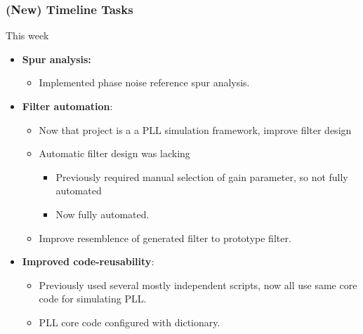 \documentclass[t, screen, aspectratio=43]{beamer}
\begin{document}
\begin{frame}
	\frametitle{(New) Timeline Tasks}
	\begin{block}{This week}
		\begin{itemize}
			\footnotesize
			\item \textbf{Spur analysis:}
			\begin{itemize}
				\footnotesize
				\item Implemented phase noise reference spur analysis.
			\end{itemize} 
			\item \textbf{Filter automation}:
			\begin{itemize}
				\footnotesize
				\item Now that project is a a PLL simulation framework, improve filter design
				\item Automatic filter design was lacking
				\begin{itemize}
					\scriptsize
					\item Previously required manual selection of gain parameter, so not fully automated
					\item Now fully automated.
				\end{itemize}				
				\item Improve resemblence of generated filter to prototype filter.
			\end{itemize} 
			\item \textbf{Improved code-reusability}:
			\begin{itemize}
				\footnotesize
				\item Previously used several mostly independent scripts, now all use same core code for simulating PLL.
				\item PLL core code configured with dictionary.
			\end{itemize} 
		\end{itemize}    
	\end{block}
\end{frame}

\end{document}
